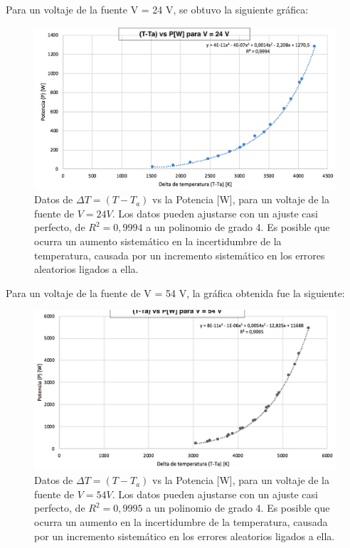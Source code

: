 \documentclass[%
 reprint,
 amsmath,amssymb,
 aps,
]{revtex4-1}
\begin{document}
Para un voltaje de la fuente V = 24 V, se obtuvo la siguiente gráfica: 
\begin{figure}[H]
    \centering
    \includegraphics[scale= 0.3]{graf2.png}
    \caption{Datos de $\Delta T = (T - T_{a})$ vs la Potencia [W], para un voltaje de la fuente de $V = 24 V$. Los datos pueden ajustarse con un ajuste casi perfecto, de $R^2 = 0,9994$ a un polinomio de grado 4. Es posible que ocurra un aumento sistemático en la incertidumbre de la temperatura, causada por un incremento sistemático en los errores aleatorios ligados a ella.}
    \label{fig:graf2excel}
\end{figure}

Para un voltaje de la fuente de V = 54 V, la gráfica obtenida fue la siguiente: 
\begin{figure}[H]
    \centering
    \includegraphics[scale= 0.3]{graf3.png}
    \caption{Datos de $\Delta T = (T - T_{a})$ vs la Potencia [W], para un voltaje de la fuente de $V = 54 V$. Los datos pueden ajustarse con un ajuste casi perfecto, de $R^2 = 0,9995$ a un polinomio de grado 4. Es posible que ocurra un aumento en la incertidumbre de la temperatura, causada por un incremento sistemático en los errores aleatorios ligados a ella.}
    \label{fig:graf3excel}
\end{figure}
\end{document}
